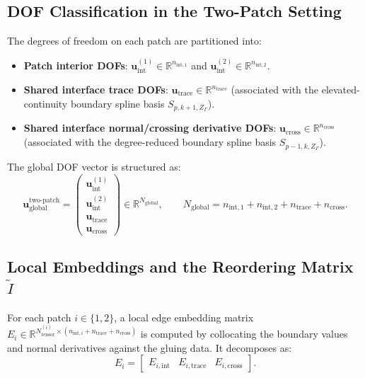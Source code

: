 \documentclass[11pt,a4paper]{article}
\newcommand{\R}{\mathbb{R}}
\begin{document}
\subsection{DOF Classification in the Two-Patch Setting}
The degrees of freedom on each patch are partitioned into:
\begin{itemize}
    \item \textbf{Patch interior DOFs}: $\mathbf{u}_{\text{int}}^{(1)} \in \R^{n_{\text{int}, 1}}$ and $\mathbf{u}_{\text{int}}^{(2)} \in \R^{n_{\text{int}, 2}}$.
    \item \textbf{Shared interface trace DOFs}: $\mathbf{u}_{\text{trace}} \in \R^{n_{\text{trace}}}$ (associated with the elevated-continuity boundary spline basis $S_{p, k+1, Z_\Gamma}$).
    \item \textbf{Shared interface normal/crossing derivative DOFs}: $\mathbf{u}_{\text{cross}} \in \R^{n_{\text{cross}}}$ (associated with the degree-reduced boundary spline basis $S_{p-1, k, Z_\Gamma}$).
\end{itemize}
The global DOF vector is structured as:
\begin{equation}
    \mathbf{u}_{\text{global}}^{\text{two-patch}} = \begin{pmatrix} \mathbf{u}_{\text{int}}^{(1)} \\ \mathbf{u}_{\text{int}}^{(2)} \\ \mathbf{u}_{\text{trace}} \\ \mathbf{u}_{\text{cross}} \end{pmatrix} \in \R^{N_{\text{global}}}, \qquad N_{\text{global}} = n_{\text{int}, 1} + n_{\text{int}, 2} + n_{\text{trace}} + n_{\text{cross}}.
\end{equation}

\subsection{Local Embeddings and the Reordering Matrix \texorpdfstring{$\widetilde{I}$}{I-tilde}}
For each patch $i \in \{1, 2\}$, a local edge embedding matrix $E_i \in \R^{N_{\text{tensor}}^{(i)} \times (n_{\text{int}, i} + n_{\text{trace}} + n_{\text{cross}})}$ is computed by collocating the boundary values and normal derivatives against the gluing data. It decomposes as:
\begin{equation}
    E_i = \begin{bmatrix} E_{i, \text{int}} & E_{i, \text{trace}} & E_{i, \text{cross}} \end{bmatrix}.
\end{equation}
\end{document}
